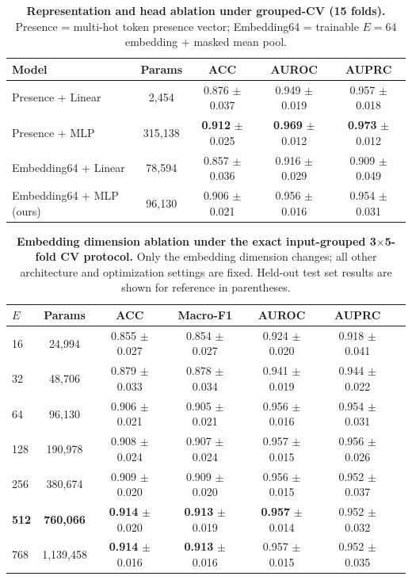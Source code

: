 \documentclass{article} %
\begin{document}
\begin{table}[ht]
\centering
\caption{\textbf{Representation and head ablation under grouped-CV (15 folds).}
Presence = multi-hot token presence vector; Embedding64 = trainable $E{=}64$ embedding + masked mean pool.}
\label{tab:repr_ablation}
\begin{tabular}{lcccc}
\toprule
\textbf{Model} & \textbf{Params} & \textbf{ACC} & \textbf{AUROC} & \textbf{AUPRC} \\
\midrule
Presence + Linear & 2,454 & 0.876 $\pm$ 0.037 & 0.949 $\pm$ 0.019 & 0.957 $\pm$ 0.018 \\
Presence + MLP & 315,138 & \textbf{0.912} $\pm$ 0.025 & \textbf{0.969} $\pm$ 0.012 & \textbf{0.973} $\pm$ 0.012 \\
Embedding64 + Linear & 78,594 & 0.857 $\pm$ 0.036 & 0.916 $\pm$ 0.029 & 0.909 $\pm$ 0.049 \\
Embedding64 + MLP (ours) & 96,130 & 0.906 $\pm$ 0.021 & 0.956 $\pm$ 0.016 & 0.954 $\pm$ 0.031 \\
\bottomrule
\end{tabular}
\end{table}

\begin{table}[ht]
\centering
\caption{\textbf{Embedding dimension ablation under the exact input-grouped 3$\times$5-fold CV protocol.}
Only the embedding dimension changes; all other architecture and optimization settings are fixed.
Held-out test set results are shown for reference in parentheses.}
\label{tab:embedding}
\begin{tabular}{lcccccr}
\toprule
\textbf{$E$} & \textbf{Params} & \textbf{ACC} & \textbf{Macro-F1} & \textbf{AUROC} & \textbf{AUPRC} \\
\midrule
16  & 24,994 & 0.855 $\pm$ 0.027 & 0.854 $\pm$ 0.027 & 0.924 $\pm$ 0.020 & 0.918 $\pm$ 0.041 \\
32  & 48,706 & 0.879 $\pm$ 0.033 & 0.878 $\pm$ 0.034 & 0.941 $\pm$ 0.019 & 0.944 $\pm$ 0.022 \\
64  & 96,130 & 0.906 $\pm$ 0.021 & 0.905 $\pm$ 0.021 & 0.956 $\pm$ 0.016 & 0.954 $\pm$ 0.031 \\
128 & 190,978 & 0.908 $\pm$ 0.024 & 0.907 $\pm$ 0.024 & 0.957 $\pm$ 0.015 & 0.956 $\pm$ 0.026 \\
256 & 380,674 & 0.909 $\pm$ 0.020 & 0.909 $\pm$ 0.020 & 0.956 $\pm$ 0.015 & 0.952 $\pm$ 0.037 \\
\textbf{512} & \textbf{760,066} & \textbf{0.914} $\pm$ 0.020 & \textbf{0.913} $\pm$ 0.019 & \textbf{0.957} $\pm$ 0.014 & 0.952 $\pm$ 0.032 \\
768 & 1,139,458 & \textbf{0.914} $\pm$ 0.016 & \textbf{0.913} $\pm$ 0.016 & 0.957 $\pm$ 0.015 & 0.952 $\pm$ 0.035 \\
\bottomrule
\end{tabular}
\end{table}
\end{document}
